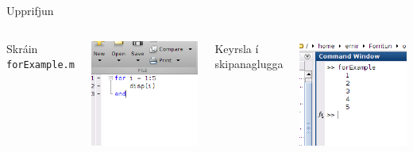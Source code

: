 \documentclass{beamer}
\begin{document}
\begin{frame}{Upprifjun}
\vspace{\baselineskip}
\begin{columns}
Skráin \texttt{forExample.m}
\begin{center}
\includegraphics[width=0.8\linewidth]{../Pics/for-example}
\end{center}
Keyrsla í skipanaglugga
\begin{center}
\includegraphics[width=0.8\linewidth]{../Pics/for-example-run}
\end{center}
\end{columns}
\end{frame}
\end{document}
